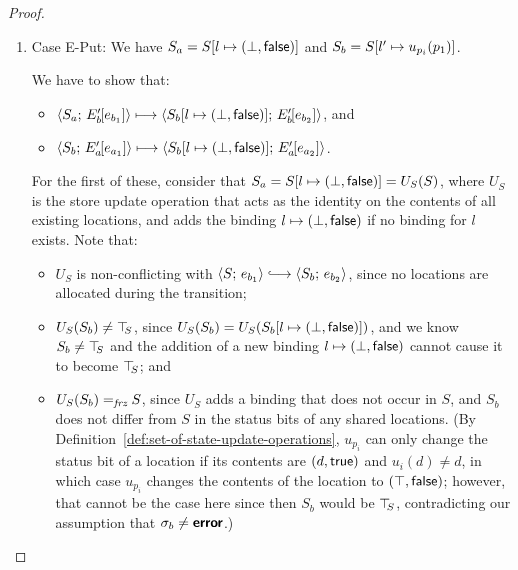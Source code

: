 \begin{proof}
\begin{enumerate}
\begin{enumerate}
\begin{itemize}
      \end{itemize}

    \item \label{slqc-new-put}Case {\sc E-Put}: We have $S_a =
      S[l \mapsto (\bot, \textsf{false})]$ and $S_b =
      S[l' \mapsto u_{p_i}(p_1)]$.

      We have to show that:
      \begin{itemize}
      \item $\langle S_a;\, E'_b\hspace{-1mm}\left[e_{b_1}\right] \rangle \longmapsto
        \langle S_b[l \mapsto (\bot, \textsf{false})];\, E'_b\hspace{-1mm}\left[e_{b_2}\right] \rangle$,
        and
      \item
        $\langle S_b;\, E'_a\hspace{-1mm}\left[e_{a_1}\right] \rangle \longmapsto
        \langle S_b[l \mapsto (\bot, \textsf{false})];\, E'_a\hspace{-1mm}\left[e_{a_2}\right] \rangle$.
      \end{itemize}

      For the first of these, consider that $S_a =
      S[l \mapsto (\bot, \textsf{false})] = U_S(S)$, where $U_S$ is the
      store update operation that acts as the identity on the contents
      of all existing locations, and adds the binding
      $l \mapsto (\bot, \textsf{false})$ if no binding for $l$
      exists.  Note that:
      \begin{itemize}
      \item $U_S$ is non-conflicting with $\config{S}{e_{b_1}}
        \parstepsto \config{S_b}{e_{b_2}}$, since no locations are
        allocated during the transition;
        \item $U_S(S_b) \neq \top\hspace{-0.85mm}_{S}$, since $U_S(S_b) =
          U_S(S_b[l \mapsto (\bot, \textsf{false})])$, and we know $S_b
          \neq \top\hspace{-0.85mm}_{S}$ and the addition of a new binding
          $l \mapsto (\bot, \textsf{false})$ cannot cause it to
          become $\top\hspace{-0.85mm}_{S}$; and
        \item $U_S(S_b) =_{\textit{frz}} S$, since $U_S$ adds a binding that
          does not occur in $S$, and $S_b$ does not differ from $S$ in
          the status bits of any shared locations.  (By
          Definition~\ref{def:set-of-state-update-operations},
          $u_{p_i}$ can only change the status bit of a location if
          its contents are $(d, \textsf{true})$ and $u_i(d) \neq
          d$, in which case $u_{p_i}$ changes the contents of the
          location to $(\top, \textsf{false})$; however, that
          cannot be the case here since then $S_b$ would be $\top\hspace{-0.85mm}_{S}$,
          contradicting our assumption that $\sigma_b \neq \textbf{\textsf{error}}$.)
      \end{itemize}


\end{enumerate}
\end{enumerate}
\end{proof}
